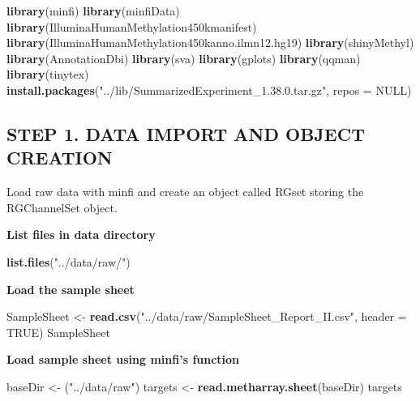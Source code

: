 \documentclass[
  11pt,
]{article}
\newenvironment{Shaded}{\begin{snugshade}}{\end{snugshade}}
\newcommand{\AttributeTok}[1]{\textcolor[rgb]{0.13,0.29,0.53}{#1}}
\newcommand{\ConstantTok}[1]{\textcolor[rgb]{0.56,0.35,0.01}{#1}}
\newcommand{\FunctionTok}[1]{\textcolor[rgb]{0.13,0.29,0.53}{\textbf{#1}}}
\newcommand{\NormalTok}[1]{#1}
\newcommand{\OtherTok}[1]{\textcolor[rgb]{0.56,0.35,0.01}{#1}}
\newcommand{\StringTok}[1]{\textcolor[rgb]{0.31,0.60,0.02}{#1}}
\begin{document}
\begin{Shaded}
\begin{Highlighting}[]
\FunctionTok{library}\NormalTok{(minfi)}
\FunctionTok{library}\NormalTok{(minfiData)}
\FunctionTok{library}\NormalTok{(IlluminaHumanMethylation450kmanifest)}
\FunctionTok{library}\NormalTok{(IlluminaHumanMethylation450kanno.ilmn12.hg19)}
\FunctionTok{library}\NormalTok{(shinyMethyl)}
\FunctionTok{library}\NormalTok{(AnnotationDbi)}
\FunctionTok{library}\NormalTok{(sva)}
\FunctionTok{library}\NormalTok{(gplots)}
\FunctionTok{library}\NormalTok{(qqman)}
\FunctionTok{library}\NormalTok{(tinytex)}
\FunctionTok{install.packages}\NormalTok{(}\StringTok{"../lib/SummarizedExperiment\_1.38.0.tar.gz"}\NormalTok{, }\AttributeTok{repos =} \ConstantTok{NULL}\NormalTok{)}
\end{Highlighting}
\end{Shaded}

\subsection{STEP 1. DATA IMPORT AND OBJECT
CREATION}\label{step-1.-data-import-and-object-creation}

Load raw data with minfi and create an object called RGset storing the
RGChannelSet object.

\textbf{List files in data directory}

\begin{Shaded}
\begin{Highlighting}[]
\FunctionTok{list.files}\NormalTok{(}\StringTok{"../data/raw/"}\NormalTok{)}
\end{Highlighting}
\end{Shaded}

\textbf{Load the sample sheet}

\begin{Shaded}
\begin{Highlighting}[]
\NormalTok{SampleSheet }\OtherTok{\textless{}{-}} \FunctionTok{read.csv}\NormalTok{(}\StringTok{"../data/raw/SampleSheet\_Report\_II.csv"}\NormalTok{, }\AttributeTok{header =} \ConstantTok{TRUE}\NormalTok{)}
\NormalTok{SampleSheet}
\end{Highlighting}
\end{Shaded}

\textbf{Load sample sheet using minfi's function}

\begin{Shaded}
\begin{Highlighting}[]
\NormalTok{baseDir }\OtherTok{\textless{}{-}}\NormalTok{ (}\StringTok{"../data/raw"}\NormalTok{)}
\NormalTok{targets }\OtherTok{\textless{}{-}} \FunctionTok{read.metharray.sheet}\NormalTok{(baseDir)}
\NormalTok{targets}
\end{Highlighting}
\end{Shaded}
\end{document}
